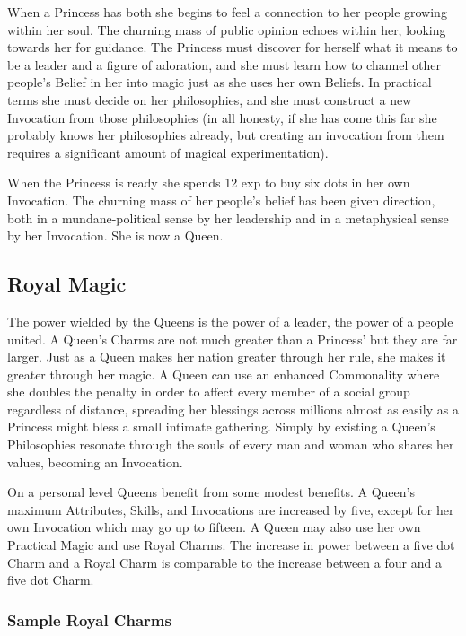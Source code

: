 When a Princess has both she begins to feel a connection to her people growing within her soul. The churning mass of public opinion echoes within her, looking towards her for guidance. The Princess must discover for herself what it means to be a leader and a figure of adoration, and she must learn how to channel other people's Belief in her into magic just as she uses her own Beliefs. In practical terms she must decide on her philosophies, and she must construct a new Invocation from those philosophies (in all honesty, if she has come this far she probably knows her philosophies already, but creating an invocation from them requires a significant amount of magical experimentation). 

When the Princess is ready she spends 12 exp to buy six dots in her own Invocation. The churning mass of her people's belief has been given direction, both in a mundane-political sense by her leadership and in a metaphysical sense by her Invocation. She is now a Queen.

\subsection*{Royal Magic}

The power wielded by the Queens is the power of a leader, the power of a people united. A Queen's Charms are not much greater than a Princess' but they are far larger. Just as a Queen makes her nation greater through her rule, she makes it greater through her magic. A Queen can use an enhanced Commonality where she doubles the penalty in order to affect every member of a social group regardless of distance, spreading her blessings across millions almost as easily as a Princess might bless a small intimate gathering. Simply by existing a Queen's Philosophies resonate through the souls of every man and woman who shares her values, becoming an Invocation. 

On a personal level Queens benefit from some modest benefits. A Queen's maximum Attributes, Skills, and Invocations are increased by five, except for her own Invocation which may go up to fifteen. A Queen may also use her own Practical Magic and use Royal Charms. The increase in power between a five dot Charm and a Royal Charm is comparable to the increase between a four and a five dot Charm.

\subsubsection*{Sample Royal Charms}

